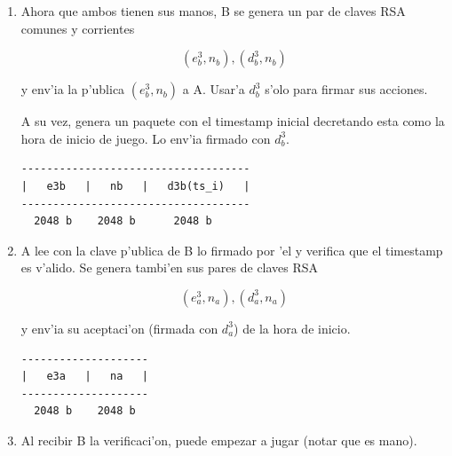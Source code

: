 \begin{enumerate}
\item Ahora que ambos tienen sus manos, B se genera un par de claves RSA comunes y corrientes 

$$	(e^3_b, n_b), (d^3_b, n_b)  $$
	
y env'ia la p'ublica $(e^3_b, n_b)$ a A. Usar'a $d^3_b$ s'olo para firmar sus acciones.

A su vez, genera un paquete con el timestamp inicial decretando esta como la hora de inicio de juego. Lo env'ia firmado con $d^3_b$.

\begin{verbatim}
------------------------------------
|   e3b   |   nb   |   d3b(ts_i)   |
------------------------------------
  2048 b    2048 b      2048 b
\end{verbatim}
  
  
  


\item A lee con la clave p'ublica de B lo firmado por 'el y verifica que el timestamp es v'alido. Se genera tambi'en sus pares de claves RSA

$$	(e^3_a, n_a), (d^3_a, n_a) $$
	
y env'ia su aceptaci'on (firmada con $d^3_a$) de la hora de inicio.


\begin{verbatim}
--------------------
|   e3a   |   na   |
--------------------
  2048 b    2048 b  
\end{verbatim}
  
  


\item Al recibir B la verificaci'on, puede empezar a jugar (notar que es mano).

\end{enumerate}
